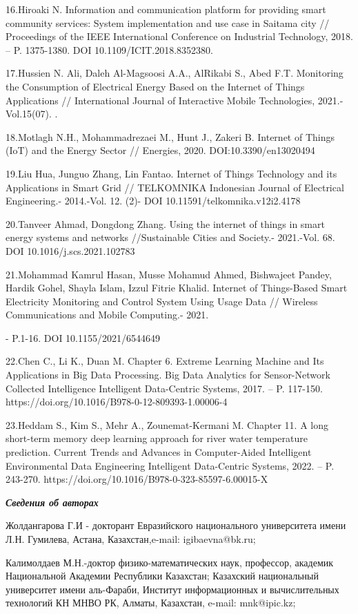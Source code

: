 16.Hiroaki N. Information and communication platform for providing smart
community services: System implementation and use case in Saitama city
// Proceedings of the IEEE International Conference on Industrial
Technology, 2018. -- P. 1375-1380. DOI 10.1109/ICIT.2018.8352380.

17.Hussien N. Ali, Daleh Al-Magsoosi A.A., AlRikabi S., Abed F.T.
Monitoring the Consumption of Electrical Energy Based on the Internet of
Things Applications // International Journal of Interactive Mobile
Technologies, 2021.-Vol.15(07). .

18.Motlagh N.H., Mohammadrezaei M., Hunt J., Zakeri B. Internet of
Things (IoT) and the Energy Sector // Energies, 2020.
DOI:10.3390/en13020494

19.Liu Hua, Junguo Zhang, Lin Fantao. Internet of Things Technology and
its Applications in Smart Grid // TELKOMNIKA Indonesian Journal of
Electrical Engineering.- 2014.-Vol. 12. (2)- DOI
10.11591/telkomnika.v12i2.4178

20.Tanveer Ahmad, Dongdong Zhang. Using the internet of things in smart
energy systems and networks //Sustainable Cities and Society.-
2021.-Vol. 68. DOI 10.1016/j.scs.2021.102783

21.Mohammad Kamrul Hasan, Musse Mohamud Ahmed, Bishwajeet Pandey, Hardik
Gohel, Shayla Islam, Izzul Fitrie Khalid. Internet of Things-Based Smart
Electricity Monitoring and Control System Using Usage Data // Wireless
Communications and Mobile Computing.- 2021.

- P.1-16. DOI 10.1155/2021/6544649

22.Chen C., Li K., Duan M. Chapter 6. Extreme Learning Machine and Its
Applications in Big Data Processing. Big Data Analytics for
Sensor-Network Collected Intelligence Intelligent Data-Centric Systems,
2017. -- P. 117-150. https://doi.org/10.1016/B978-0-12-809393-1.00006-4

23.Heddam S., Kim S., Mehr A., Zounemat-Kermani M. Chapter 11. A long
short-term memory deep learning approach for river water temperature
prediction. Current Trends and Advances in Computer-Aided Intelligent
Environmental Data Engineering Intelligent Data-Centric Systems, 2022.
-- P. 243-270. https://doi.org/10.1016/B978-0-323-85597-6.00015-X

\emph{{\bfseries Сведения об авторах}}

Жолдангарова Г.И - докторант Евразийского национального университета
имени Л.Н. Гумилева, Астана, Казахстан,e-mail: igibaevna@bk.ru;

Калимолдаев М.Н.-доктор физико-математических наук, профессор, академик
Национальной Академии Республики Казахстан; Казахский национальный
университет имени аль-Фараби, Институт информационных и вычислительных
технологий КН МНВО РК, Алматы, Казахстан, e-mail: mnk@ipic.kz;

